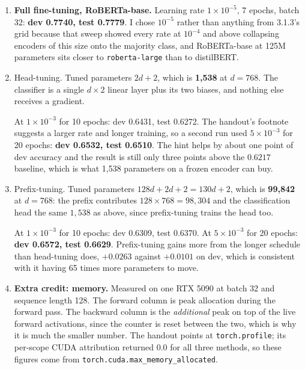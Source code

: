 \documentclass[11pt]{article}
\begin{document}
\begin{enumerate}
  \item \textbf{Full fine-tuning, RoBERTa-base.} Learning rate $1 \times 10^{-5}$, 7 epochs,
        batch 32: \textbf{dev 0.7740, test 0.7779}. I chose $10^{-5}$ rather than anything from
        3.1.3's grid because that sweep showed every rate at $10^{-4}$ and above collapsing
        encoders of this size onto the majority class, and RoBERTa-base at 125M parameters sits
        closer to \texttt{roberta-large} than to distilBERT.

  \item Head-tuning. Tuned parameters $2d + 2$, which is \textbf{1{,}538} at $d = 768$. The classifier is a single $d \times 2$ linear layer plus its two biases, and
        nothing else receives a gradient.

        At $1 \times 10^{-3}$ for 10 epochs: dev 0.6431, test 0.6272. The handout's footnote
        suggests a larger rate and longer training, so a second run used $5 \times 10^{-3}$ for 20
        epochs: \textbf{dev 0.6532, test 0.6510}. The hint helps by about one point of dev
        accuracy and the result is still only three points above the $0.6217$ baseline, which is
        what 1{,}538 parameters on a frozen encoder can buy.

  \item Prefix-tuning. Tuned parameters $128d + 2d + 2 = 130d + 2$, which is \textbf{99{,}842} at $d = 768$: the prefix contributes $128 \times 768 = 98{,}304$ and
        the classification head the same $1{,}538$ as above, since prefix-tuning trains the head
        too.

        At $1 \times 10^{-3}$ for 10 epochs: dev 0.6309, test 0.6370. At $5 \times 10^{-3}$ for
        20 epochs: \textbf{dev 0.6572, test 0.6629}. Prefix-tuning gains more from the longer
        schedule than head-tuning does, $+0.0263$ against $+0.0101$ on dev, which is consistent
        with it having 65 times more parameters to move.

  \item \textbf{Extra credit: memory.} Measured on one RTX 5090 at batch 32 and sequence length
        128. The forward column is peak allocation during the forward pass. The backward column is
        the \emph{additional} peak on top of the live forward activations, since the counter is
        reset between the two, which is why it is much the smaller number. The handout points at
        \texttt{torch.profile}; its per-scope CUDA attribution returned $0.0$ for all three
        methods, so these figures come from \texttt{torch.cuda.max\_memory\_allocated}.


\end{enumerate}
\end{document}
